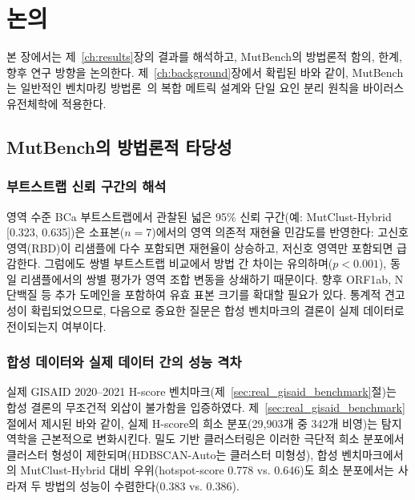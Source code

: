 \chapter{논의}
\label{ch:discussion}

본 장에서는 제~\ref{ch:results}장의 결과를 해석하고, MutBench의 방법론적 함의, 한계, 향후 연구 방향을 논의한다.
제~\ref{ch:background}장에서 확립된 바와 같이, MutBench는 일반적인 벤치마킹 방법론~\cite{weber2019benchmarking,boulesteix2017towards}의 복합 메트릭 설계와 단일 요인 분리 원칙을 바이러스 유전체학에 적용한다.

\section{MutBench의 방법론적 타당성}

\subsection{부트스트랩 신뢰 구간의 해석}
\label{sec:bootstrap_interpretation}

영역 수준 BCa 부트스트랩에서 관찰된 넓은 95\% 신뢰 구간(예: MutClust-Hybrid [0.323, 0.635])은 소표본($n = 7$)에서의 영역 의존적 재현율 민감도를 반영한다: 고신호 영역(RBD)이 리샘플에 다수 포함되면 재현율이 상승하고, 저신호 영역만 포함되면 급감한다.
그럼에도 쌍별 부트스트랩 비교에서 방법 간 차이는 유의하며($p < 0.001$), 동일 리샘플에서의 쌍별 평가가 영역 조합 변동을 상쇄하기 때문이다.
향후 ORF1ab, N 단백질 등 추가 도메인을 포함하여 유효 표본 크기를 확대할 필요가 있다.
통계적 견고성이 확립되었으므로, 다음으로 중요한 질문은 합성 벤치마크의 결론이 실제 데이터로 전이되는지 여부이다.

\subsection{합성 데이터와 실제 데이터 간의 성능 격차}
\label{sec:synthetic_real_gap}

실제 GISAID 2020--2021 H-score 벤치마크(제~\ref{sec:real_gisaid_benchmark}절)는 합성 결론의 무조건적 외삽이 불가함을 입증하였다.
제~\ref{sec:real_gisaid_benchmark}절에서 제시된 바와 같이, 실제 H-score의 희소 분포(29,903개 중 342개 비영)는 탐지 역학을 근본적으로 변화시킨다.
밀도 기반 클러스터링은 이러한 극단적 희소 분포에서 클러스터 형성이 제한되며(HDBSCAN-Auto는 클러스터 미형성), 합성 벤치마크에서의 MutClust-Hybrid 대비 우위(hotspot-score 0.778 vs. 0.646)도 희소 분포에서는 사라져 두 방법의 성능이 수렴한다(0.383 vs. 0.386).

